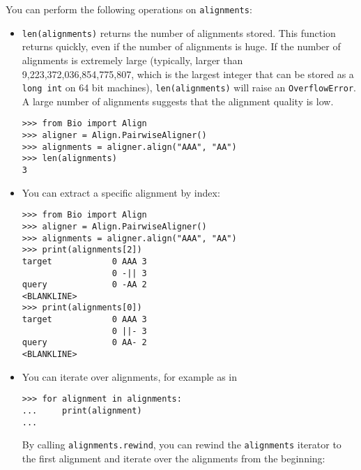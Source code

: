 You can perform the following operations on \verb+alignments+:
\begin{itemize}
\item \verb+len(alignments)+ returns the number of alignments stored. This function returns quickly, even if the number of alignments is huge. If the number of alignments is extremely large (typically, larger than 9,223,372,036,854,775,807, which is the largest integer that can be stored as a \verb+long int+ on 64 bit machines), \verb+len(alignments)+ will raise an \verb+OverflowError+. A large number of alignments suggests that the alignment quality is low.

\begin{verbatim}
>>> from Bio import Align
>>> aligner = Align.PairwiseAligner()
>>> alignments = aligner.align("AAA", "AA")
>>> len(alignments)
3
\end{verbatim}
\item You can extract a specific alignment by index:

\begin{verbatim}
>>> from Bio import Align
>>> aligner = Align.PairwiseAligner()
>>> alignments = aligner.align("AAA", "AA")
>>> print(alignments[2])
target            0 AAA 3
                  0 -|| 3
query             0 -AA 2
<BLANKLINE>
>>> print(alignments[0])
target            0 AAA 3
                  0 ||- 3
query             0 AA- 2
<BLANKLINE>
\end{verbatim}
\item You can iterate over alignments, for example as in
\begin{verbatim}
>>> for alignment in alignments:
...     print(alignment)
...
\end{verbatim}
By calling \verb+alignments.rewind+, you can rewind the \verb+alignments+ iterator to the first alignment and iterate over the alignments from the beginning:


\end{itemize}
